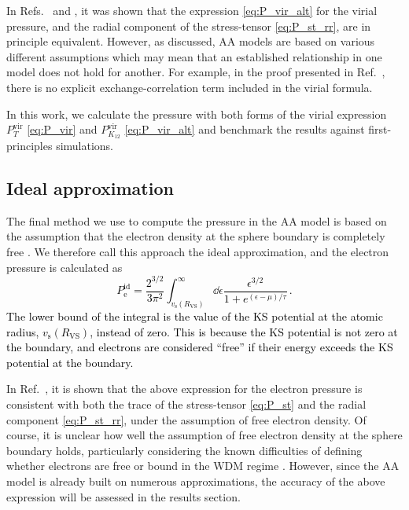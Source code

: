 \documentclass[%
 preprint,
 superscriptaddress,
 amsmath,amssymb,
longbibliography,
]{revtex4-2}
\newcommand{\RWS}{R_\textrm{VS}}
\newcommand{\T}{\tau}
\newcommand{\change}[1]{\textcolor{black}{#1}}
\newcommand{\Pe}{P_\textrm{e}}
\newcommand{\Pvirt}{P^\textrm{vir}_T}
\newcommand{\Pvirk}{P^\textrm{vir}_{K_{12}}}
\begin{document}
In Refs.~ and , it was shown that the expression \eqref{eq:P_vir_alt} for the virial pressure, and the radial component of the stress-tensor \eqref{eq:P_st_rr}, are in principle equivalent. However, as discussed, AA models are based on various different assumptions which may mean that an established relationship in one model does not hold for another. For example, in the proof presented in Ref.~, there is no explicit exchange-correlation term included in the virial formula.

In this work, we calculate the pressure with both forms of the virial expression $\Pvirt$ \eqref{eq:P_vir} and $\Pvirk$ \eqref{eq:P_vir_alt} and benchmark the results against first-principles simulations.

\subsection{Ideal approximation}\label{sec:P_id}

The final method we use to compute the pressure in the AA model is based on the assumption that the electron density at the sphere boundary is completely free \cite{Johnson_presssure}. We therefore call this approach the ideal approximation, and the electron pressure is calculated as \cite{Callow_AA_22}
\change{\begin{equation}\label{eq:P_id}
    \Pe^\textrm{id} = \frac{2^{3/2}}{3\pi^2} \int_{v_\textrm{s}(\RWS)}^\infty \dd{\epsilon}
    \frac{\epsilon^{3/2}}{1+e^{(\epsilon-\mu)/\T}}\,.
\end{equation}
The lower bound of the integral is the value of the KS potential at the atomic radius, $v_\textrm{s}(\RWS)$, instead of zero. This is because the KS potential is not zero at the boundary, and electrons are considered ``free'' if their energy exceeds the KS potential at the boundary.}

In Ref.~\cite{Pressure_warm_hot}, it is shown that the above expression for the electron pressure is consistent with both the trace of the stress-tensor \eqref{eq:P_st} and the radial component \eqref{eq:P_st_rr}, under the assumption of free electron density. Of course, it is unclear how well the assumption of free electron density at the sphere boundary holds, particularly considering the known difficulties of defining whether electrons are free or bound in the WDM regime \cite{Callow_MIS}. However, since the AA model is already built on numerous approximations, the accuracy of the above expression will be assessed in the results section.
\end{document}
